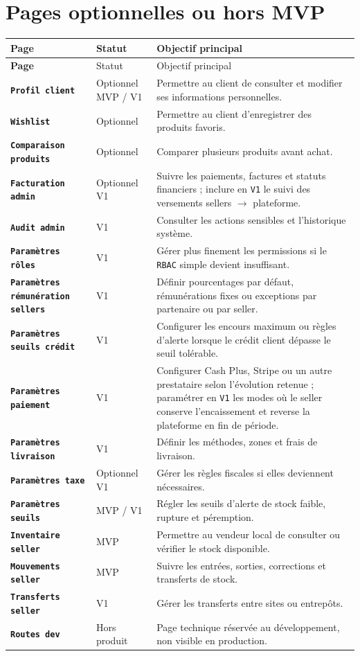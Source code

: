 \documentclass[11pt,a4paper]{scrreprt}
\newcommand{\code}[1]{\texttt{#1}}
\begin{document}
\section{Pages optionnelles ou hors MVP}
\begin{longtable}{>{\bfseries}p{4cm}p{3cm}p{7cm}}
\toprule
Page & Statut & Objectif principal \\
\midrule
\endfirsthead
\toprule
Page & Statut & Objectif principal \\
\midrule
\endhead
\code{Profil client} & Optionnel MVP / V1 & Permettre au client de consulter et modifier ses informations personnelles. \\
\code{Wishlist} & Optionnel & Permettre au client d'enregistrer des produits favoris. \\
\code{Comparaison produits} & Optionnel & Comparer plusieurs produits avant achat. \\
\code{Facturation admin} & Optionnel V1 & Suivre les paiements, factures et statuts financiers ; inclure en \code{V1} le suivi des versements sellers \(\rightarrow\) plateforme. \\
\code{Audit admin} & V1 & Consulter les actions sensibles et l'historique système. \\
\code{Paramètres rôles} & V1 & Gérer plus finement les permissions si le \code{RBAC} simple devient insuffisant. \\
\code{Paramètres rémunération sellers} & V1 & Définir pourcentages par défaut, rémunérations fixes ou exceptions par partenaire ou par seller. \\
\code{Paramètres seuils crédit} & V1 & Configurer les encours maximum ou règles d'alerte lorsque le crédit client dépasse le seuil tolérable. \\
\code{Paramètres paiement} & V1 & Configurer Cash Plus, Stripe ou un autre prestataire selon l'évolution retenue ; paramétrer en \code{V1} les modes où le seller conserve l'encaissement et reverse la plateforme en fin de période. \\
\code{Paramètres livraison} & V1 & Définir les méthodes, zones et frais de livraison. \\
\code{Paramètres taxe} & Optionnel V1 & Gérer les règles fiscales si elles deviennent nécessaires. \\
\code{Paramètres seuils} & MVP / V1 & Régler les seuils d'alerte de stock faible, rupture et péremption. \\
\code{Inventaire seller} & MVP & Permettre au vendeur local de consulter ou vérifier le stock disponible. \\
\code{Mouvements seller} & MVP & Suivre les entrées, sorties, corrections et transferts de stock. \\
\code{Transferts seller} & V1 & Gérer les transferts entre sites ou entrepôts. \\
\code{Routes dev} & Hors produit & Page technique réservée au développement, non visible en production. \\
\bottomrule
\end{longtable}
\end{document}
